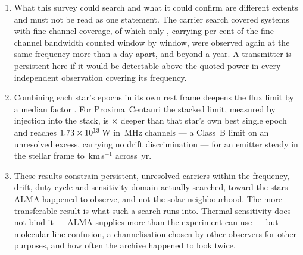 \begin{enumerate}[leftmargin=1.6em,itemsep=4pt,topsep=4pt,parsep=0pt]
\item What this survey could search and what it could confirm are different
extents and must not be read as one statement. The carrier search covered
\RcSearchSys{} systems with fine-channel coverage, of which only
\RcConfSysDay{}, carrying
\RcConfPctDay{} per cent of the fine-channel bandwidth counted window by
window, were observed again at the same frequency more than a day apart,
and \RcConfSysYr{} beyond a year. A transmitter is persistent
here if it would be detectable above the quoted power in every independent
observation covering its frequency.

\item Combining each star's epochs in its own rest frame deepens the flux
limit by a median factor \StkLimitGainMed. For Proxima~Centauri the stacked
limit, measured by injection into the stack, is \StkProxGain$\times$ deeper
than that star's own best single epoch and reaches $1.73\times10^{13}$\,W in
\ChanBModeMHz\,MHz channels --- a Class~B limit on an unresolved excess,
carrying no drift discrimination --- for an emitter steady in the stellar
frame to \StkProxTolKms\,km\,s$^{-1}$ across \StkProxSpanYr\,yr.

\item These results constrain persistent, unresolved carriers within the
frequency, drift, duty-cycle and sensitivity domain actually searched,
toward the stars ALMA happened to observe, and not the solar neighbourhood.
The more transferable result is what such a search runs into. Thermal
sensitivity does not bind it --- ALMA supplies more than the experiment can
use --- but molecular-line confusion, a channelisation chosen by other
observers for other purposes, and how often the archive happened to look
twice.

\end{enumerate}
